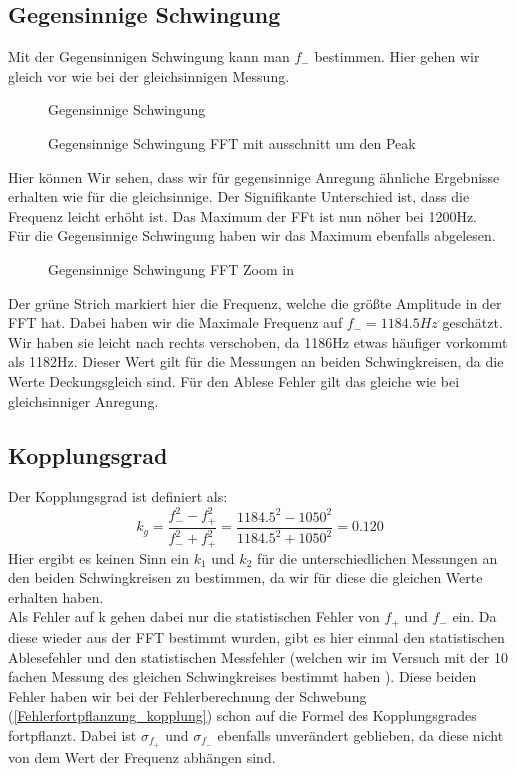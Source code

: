 \documentclass[twoside]{protokoll}
\begin{document}
\subsection{Gegensinnige Schwingung}
Mit der Gegensinnigen Schwingung kann man $f_-$ bestimmen. Hier gehen wir gleich vor wie bei der gleichsinnigen Messung.
\begin{figure}[H]
    \centering
    \caption{Gegensinnige Schwingung}
\end{figure}
\begin{figure}[H]
    \centering
    \caption{Gegensinnige Schwingung FFT mit ausschnitt um den Peak}
\end{figure}
Hier können Wir sehen, dass wir für gegensinnige Anregung ähnliche Ergebnisse erhalten wie für die gleichsinnige. Der Signifikante Unterschied ist, dass die Frequenz leicht erhöht ist. 
Das Maximum der FFt ist nun nöher bei 1200Hz.\\
 
Für die Gegensinnige Schwingung haben wir das Maximum ebenfalls abgelesen.
\begin{figure}[H]
    \centering
    \caption{Gegensinnige Schwingung FFT Zoom in}
\end{figure}
Der grüne Strich markiert hier die Frequenz, welche die größte Amplitude in der FFT hat.
Dabei haben wir die Maximale Frequenz auf $f_-=1184.5Hz$ geschätzt.
Wir haben sie leicht nach rechts verschoben, da 1186Hz etwas häufiger vorkommt als 1182Hz.
Dieser Wert gilt für die Messungen an beiden Schwingkreisen, da die Werte Deckungsgleich sind.
Für den Ablese Fehler gilt das gleiche wie bei gleichsinniger Anregung.

\subsection{Kopplungsgrad}
Der Kopplungsgrad ist definiert als:
\begin{equation}
    k_g = \frac{f_-^2-f_+^2}{f_-^2+f_+^2} = \frac{1184.5^2-1050^2}{1184.5^2+1050^2} = 0.120
\end{equation}
Hier ergibt es keinen Sinn ein $k_1$ und $k_2$ für die unterschiedlichen Messungen an den beiden Schwingkreisen zu bestimmen, da wir für diese die gleichen Werte erhalten haben. \\
 
Als Fehler auf k gehen dabei nur die statistischen Fehler von $f_+$ und $f_-$ ein.
Da diese wieder aus der FFT bestimmt wurden, gibt es hier einmal den statistischen Ablesefehler und den statistischen Messfehler (welchen wir im Versuch mit der 10 fachen Messung des gleichen Schwingkreises bestimmt haben ).
Diese beiden Fehler haben wir bei der Fehlerberechnung der Schwebung (\ref{Fehlerfortpflanzung_kopplung}) schon auf die Formel des Kopplungsgrades fortpflanzt.
Dabei ist $\sigma_{f_+}$ und $\sigma_{f_-}$ ebenfalls unverändert geblieben, da diese nicht von dem Wert der Frequenz abhängen sind.
 
\end{document}
